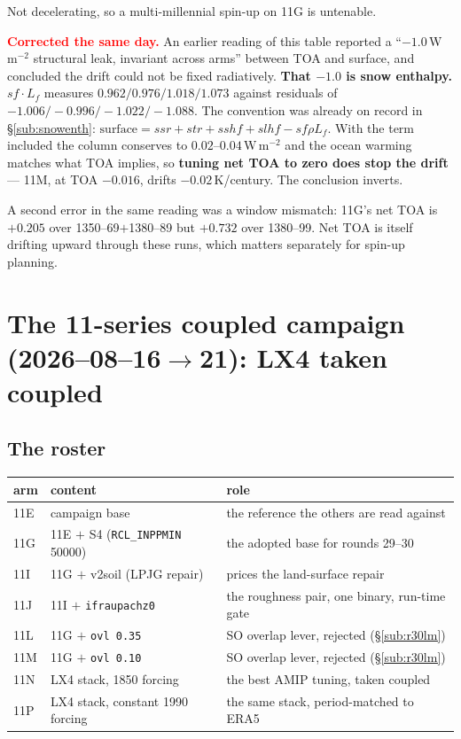 \documentclass[10pt]{article}
\begin{document}
Not decelerating, so a multi-millennial spin-up on 11G is untenable.

\textcolor{red}{\textbf{Corrected the same day.}} An earlier reading of this table
reported a ``$-1.0$\,W\,m$^{-2}$ structural leak, invariant across arms'' between TOA and
surface, and concluded the drift could not be fixed radiatively. \textbf{That $-1.0$ is
snow enthalpy.} $sf\cdot L_f$ measures $0.962/0.976/1.018/1.073$ against residuals of
$-1.006/-0.996/-1.022/-1.088$. The convention was already on record in
\S\ref{sub:snowenth}: $\text{surface}=ssr+str+sshf+slhf-sf\rho L_f$. With the term
included the column conserves to $0.02$--$0.04$\,W\,m$^{-2}$ and the ocean warming matches
what TOA implies, so \textbf{tuning net TOA to zero does stop the drift} --- 11M, at TOA
$-0.016$, drifts $-0.02$\,K/century. The conclusion inverts.

A second error in the same reading was a window mismatch: 11G's net TOA is $+0.205$ over
1350--69$+$1380--89 but $+0.732$ over 1380--99. Net TOA is itself drifting upward through
these runs, which matters separately for spin-up planning.

\section{The 11-series coupled campaign (2026--08--16$\to$21): LX4 taken coupled}\label{sec:r11series}

\subsection{The roster}\label{sub:r11roster}

\begin{center}\small
\begin{tabular}{llp{}}
\toprule
arm & content & role \\
\midrule
11E & campaign base & the reference the others are read against \\
11G & 11E $+$ S4 (\texttt{RCL\_INPPMIN} 50000) & the adopted base for rounds 29--30 \\
11I & 11G $+$ v2soil (LPJG repair) & prices the land-surface repair \\
11J & 11I $+$ \texttt{ifraupachz0} & the roughness pair, one binary, run-time gate \\
11L & 11G $+$ \texttt{ovl 0.35} & SO overlap lever, rejected (\S\ref{sub:r30lm}) \\
11M & 11G $+$ \texttt{ovl 0.10} & SO overlap lever, rejected (\S\ref{sub:r30lm}) \\
11N & LX4 stack, 1850 forcing & the best AMIP tuning, taken coupled \\
11P & LX4 stack, constant 1990 forcing & the same stack, period-matched to ERA5 \\
\bottomrule
\end{tabular}
\end{center}
\end{document}
